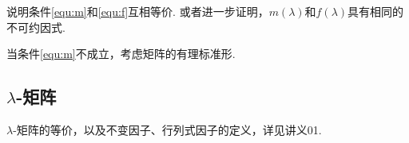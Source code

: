 \begin{remark} 说明条件\eqref{equ:m}和\eqref{equ:f}互相等价. 或者进一步证明，$m(\lambda)$和$f(\lambda)$具有相同的不可约因式.
\end{remark}
\vspace{3cm}

\begin{remark}
	当条件\eqref{equ:m}不成立，考虑矩阵的有理标准形.
\end{remark}
\vspace{0.5cm}



\subsection{$\lambda$-矩阵}
$\lambda$-矩阵的等价，以及不变因子、行列式因子的定义，详见讲义01.

